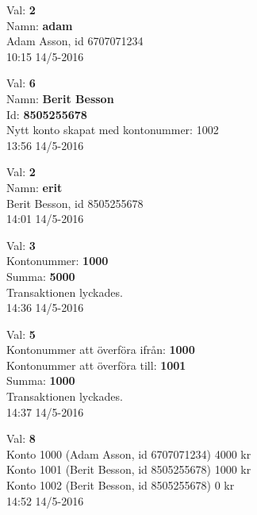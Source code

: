 \begin{multicols}{2}
\begin{exampleblock}
Val: \textbf{2}\\
Namn: \textbf{adam}\\
Adam Asson, id 6707071234\\
10:15 14/5-2016\\
\end{exampleblock}
\begin{exampleblock}
Val: \textbf{6}\\
Namn: \textbf{Berit Besson}\\
Id: \textbf{8505255678}\\
Nytt konto skapat med kontonummer: 1002\\
13:56 14/5-2016\\
\end{exampleblock}
\begin{exampleblock}
Val: \textbf{2}\\
Namn: \textbf{erit}\\
Berit Besson, id 8505255678\\
14:01 14/5-2016\\
\end{exampleblock}
\begin{exampleblock}
Val: \textbf{3}\\
Kontonummer: \textbf{1000}\\
Summa: \textbf{5000}\\
Transaktionen lyckades.\\
14:36 14/5-2016\\
\end{exampleblock}
\begin{exampleblock}
Val: \textbf{5}\\
Kontonummer att överföra ifrån: \textbf{1000}\\
Kontonummer att överföra till: \textbf{1001}\\
Summa: \textbf{1000}\\
Transaktionen lyckades.\\
14:37 14/5-2016\\
\end{exampleblock}
\begin{exampleblock}
Val: \textbf{8}\\
Konto 1000 (Adam Asson, id 6707071234) 4000 kr\\
Konto 1001 (Berit Besson, id 8505255678) 1000 kr\\
Konto 1002 (Berit Besson, id 8505255678) 0 kr\\
14:52 14/5-2016\\
\end{exampleblock}

\end{multicols}
